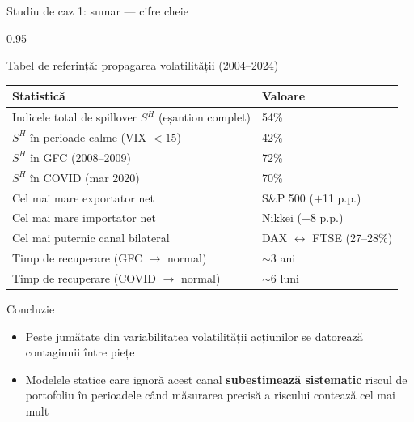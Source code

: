 \documentclass[9pt, aspectratio=169, t]{beamer}
\begin{document}
\begin{frame}{Studiu de caz 1: sumar --- cifre cheie}
    \begin{cminipage}{0.95\textwidth}
    {\footnotesize
    \begin{block}{Tabel de referință: propagarea volatilității (2004--2024)}
        \vspace{0.1cm}
        {\small
        \begin{center}
        \begin{tabular}{l|l}
            \hline
            \textbf{Statistică} & \textbf{Valoare} \\
            \hline
            Indicele total de spillover $S^H$ (eșantion complet) & 54\% \\
            $S^H$ în perioade calme (VIX $< 15$) & 42\% \\
            $S^H$ în GFC (2008--2009) & 72\% \\
            $S^H$ în COVID (mar 2020) & 70\% \\
            Cel mai mare exportator net & S\&P 500 ($+$11 p.p.) \\
            Cel mai mare importator net & Nikkei ($-$8 p.p.) \\
            Cel mai puternic canal bilateral & DAX $\leftrightarrow$ FTSE (27--28\%) \\
            Timp de recuperare (GFC $\rightarrow$ normal) & $\sim$3 ani \\
            Timp de recuperare (COVID $\rightarrow$ normal) & $\sim$6 luni \\
            \hline
        \end{tabular}
        \end{center}
        }
    \end{block}
    \begin{alertblock}{Concluzie}
        \begin{itemize}\setlength{\itemsep}{0pt}
            \item Peste jumătate din variabilitatea volatilității acțiunilor se datorează contagiunii între piețe
            \item Modelele statice care ignoră acest canal \textbf{subestimează sistematic} riscul de portofoliu în perioadele când măsurarea precisă a riscului contează cel mai mult
        \end{itemize}
    \end{alertblock}
    }
    \end{cminipage}
\end{frame}
\end{document}
